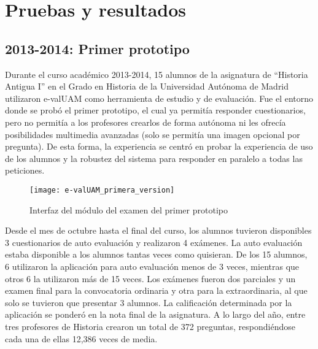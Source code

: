 \chapter{Pruebas y resultados\label{sec:pruebasYResultados}}


\section{2013-2014: Primer prototipo}


Durante el curso académico 2013-2014, 15 alumnos de la asignatura de ``Historia Antigua I'' en el Grado en Historia de la Universidad Autónoma de Madrid utilizaron e-valUAM como herramienta de estudio y de evaluación. Fue el entorno donde se probó el primer prototipo, el cual ya permitía responder cuestionarios, pero no permitía a los profesores crearlos de forma autónoma ni les ofrecía posibilidades multimedia avanzadas (solo se permitía una imagen opcional por pregunta). De esta forma, la experiencia se centró en probar la experiencia de uso de los alumnos y la robustez del sistema para responder en paralelo a todas las peticiones.

\begin{figure}[htp!]
	\centering
	\texttt{[image: e-valUAM\_primera\_version]}
	\caption{Interfaz del módulo del examen del primer prototipo}
	\label{fig:e-valUAM primera version}
\end{figure}

Desde el mes de octubre hasta el final del curso, los alumnos tuvieron disponibles 3 cuestionarios de auto evaluación y realizaron 4 exámenes. La auto evaluación estaba disponible a los alumnos tantas veces como quisieran. De los 15 alumnos, 6 utilizaron la aplicación para auto evaluación menos de 3 veces, mientras que otros 6 la utilizaron más de 15 veces. Los exámenes fueron dos parciales y un examen final para la convocatoria ordinaria y otra para la extraordinaria, al que solo se tuvieron que presentar 3 alumnos. La calificación determinada por la aplicación se ponderó en la nota final de la asignatura. A lo largo del año, entre tres profesores de Historia crearon un total de 372 preguntas, respondiéndose cada una de ellas 12,386 veces de media. 


